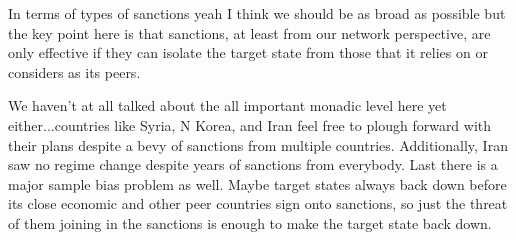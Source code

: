 In terms of types of sanctions yeah I think we should be as broad as possible but the key point here is that sanctions, at least from our network perspective, are only effective if they can isolate the target state from those that it relies on or considers as its peers. 

We haven't at all talked about the all important monadic level here yet either...countries like Syria, N Korea, and Iran feel free to plough forward with their plans despite a bevy of sanctions from multiple countries. Additionally, Iran saw no regime change despite years of sanctions from everybody. Last there is a major sample bias problem as well. Maybe target states always back down before its close economic and other peer countries sign onto sanctions, so just the threat of them joining in the sanctions is enough to make the target state back down. 